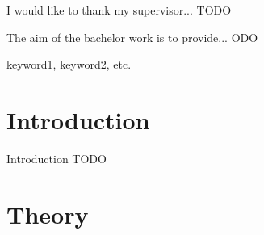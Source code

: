 \documentclass[12pt,oneside,draft]{fithesis2}
\begin{document}
  
\FrontMatter  
\ThesisTitlePage  
 
\begin{ThesisDeclaration}  
\DeclarationText  
\AdvisorName  
\end{ThesisDeclaration}  
 
\begin{ThesisThanks}  
I would like to thank my supervisor...  TODO
\end{ThesisThanks}  
 
\begin{ThesisAbstract}  
The aim of the bachelor work is to provide...  ODO
\end{ThesisAbstract}  
 
\begin{ThesisKeyWords}  
keyword1, keyword2, etc.  
\end{ThesisKeyWords}  
 
\MainMatter  

\tableofcontents  

\chapter{Introduction}  
Introduction TODO
\chapter{Theory} 
\cite{rfc_owamp}
 
 
\end{document}
